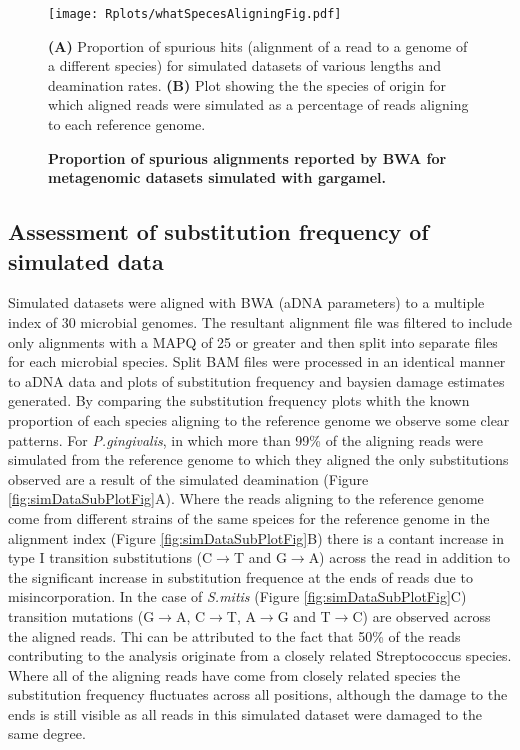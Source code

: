 \documentclass[12pt, a4paper]{article}
\begin{document}
\begin{figure}[ht!]
	\begin{center}
	\texttt{[image: Rplots/whatSpecesAligningFig.pdf]}
	\end{center}
	\caption[Proportion of spurious alignments reported by BWA for metagenomic datasets simulated with gargamel.]{\textbf{Proportion of spurious alignments reported by BWA for metagenomic datasets simulated with gargamel.}}\small{\textbf{(A)} Proportion of spurious hits (alignment of a read to a genome of a different species) for simulated datasets of various lengths and deamination rates. \textbf{(B)} Plot showing the the species of origin for which aligned reads were simulated as a percentage of reads aligning to each reference genome.}\label{fig:whatSpeciesAligningFig}
\end{figure}
\clearpage


\subsection{Assessment of substitution frequency of simulated data}
Simulated datasets were aligned with BWA (aDNA parameters) to a multiple index of 30 microbial genomes. The resultant alignment file was filtered to include only alignments with a MAPQ of 25 or greater and then split into separate files for each microbial species.  
Split BAM files were processed in an identical manner to aDNA data and plots of substitution frequency and baysien damage estimates generated. 
By comparing the substitution frequency plots whith the known proportion of each species aligning to the reference genome we observe some clear patterns.
For \textit{P.gingivalis}, in which more than 99\% of the aligning reads were simulated from the reference genome to which they aligned the only substitutions observed are a result of the simulated deamination (Figure \ref{fig:simDataSubPlotFig}A).
Where the reads aligning to the reference genome come from different strains of the same speices for the reference genome in the alignment index (Figure \ref{fig:simDataSubPlotFig}B) there is a contant increase in type I transition substitutions (C$\to$T and G$\to$A) across the read in addition to the significant increase in substitution frequence at the ends of reads due to misincorporation.
In the case of \textit{S.mitis} (Figure \ref{fig:simDataSubPlotFig}C) transition mutations (G$\to$A, C$\to$T, A$\to$G and T$\to$C) are observed across the aligned reads. Thi can be attributed to the fact that 50\% of the reads contributing to the analysis originate from a closely related Streptococcus species.
Where all of the aligning reads have come from closely related species the substitution frequency fluctuates across all positions, although the damage to the ends is still visible as all reads in this simulated dataset were damaged to the same degree.
\end{document}
